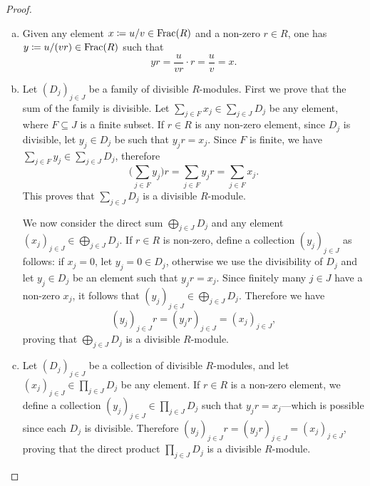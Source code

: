 \begin{proof}
    \begin{enumerate}[(a)]\setlength\itemsep{0em}
        \item Given any element \(x \coloneq u/v \in \operatorname{Frac}(R)\) and a non-zero
              \(r \in R\), one has \(y \coloneq u/(v r) \in \operatorname{Frac}(R)\) such that
              \[
                  y r = \frac{u}{v r} \cdot r = \frac{u}{v} = x.
              \]

        \item Let \((D_j)_{j \in J}\) be a family of divisible \(R\)-modules. First we
              prove that the sum of the family is divisible. Let
              \(\sum_{j \in F} x_j \in \sum_{j \in J} D_j\) be any element, where
              \(F \subseteq J\) is a finite subset. If \(r \in R\) is any non-zero element,
              since \(D_j\) is divisible, let \(y_j \in D_j\) be such that \(y_j r =
              x_j\). Since \(F\) is finite, we have \(\sum_{j \in F} y_j \in \sum_{j \in J}
              D_j\), therefore
              \[
                  \Big( \sum_{j \in F} y_j \Big) r = \sum_{j \in F} y_j r = \sum_{j \in F} x_j.
              \]
              This proves that \(\sum_{j \in J} D_j\) is a divisible \(R\)-module.

              We now consider the direct sum \(\bigoplus_{j \in J} D_j\) and any element
              \((x_j)_{j \in J} \in \bigoplus_{j \in J} D_j\). If \(r \in R\) is non-zero,
              define a collection \((y_j)_{j \in J}\) as follows: if \(x_j = 0\), let
              \(y_j = 0 \in D_j\), otherwise we use the divisibility of \(D_j\) and let
              \(y_j \in D_j\) be an element such that \(y_j r = x_j\). Since finitely many
              \(j \in J\) have a non-zero \(x_j\), it follows that \((y_j)_{j \in J} \in
              \bigoplus_{j \in J} D_j\). Therefore we have
              \[
                  (y_j)_{j \in J} r = (y_j r)_{j \in J} = (x_j)_{j \in J},
              \]
              proving that \(\bigoplus_{j \in J} D_j\) is a divisible \(R\)-module.

        \item Let \((D_j)_{j \in J}\) be a collection of divisible \(R\)-modules, and
              let \((x_j)_{j \in J} \in \prod_{j \in J} D_j\) be any element. If \(r \in R\)
              is a non-zero element, we define a collection
              \((y_j)_{j \in J} \in \prod_{j \in J} D_j\) such that \(y_j r = x_j\)---which
              is possible since each \(D_j\) is divisible. Therefore
              \((y_j)_{j \in J} r = (y_j r)_{j \in J} = (x_j)_{j \in J}\), proving that the
              direct product \(\prod_{j \in J} D_j\) is a divisible \(R\)-module.


\end{enumerate}
\end{proof}
